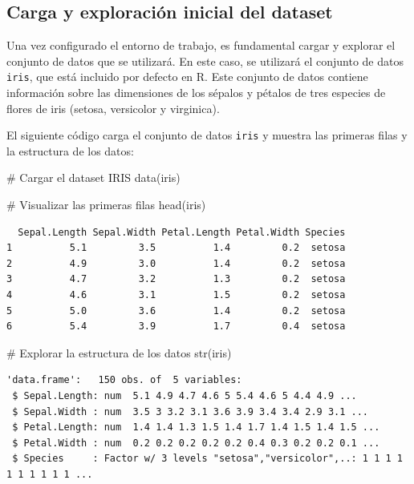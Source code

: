 \documentclass[
  spanish,
  a4paper,
  DIV=11,
  numbers=noendperiod,
  onepage,
  openany]{scrreprt}
\newenvironment{Shaded}{\begin{snugshade}}{\end{snugshade}}
\newcommand{\CommentTok}[1]{\textcolor[rgb]{0.37,0.37,0.37}{#1}}
\newcommand{\FunctionTok}[1]{\textcolor[rgb]{0.28,0.35,0.67}{#1}}
\newcommand{\NormalTok}[1]{\textcolor[rgb]{0.00,0.23,0.31}{#1}}
\begin{document}
\subsection{Carga y exploración inicial del
dataset}\label{carga-y-exploraciuxf3n-inicial-del-dataset}

Una vez configurado el entorno de trabajo, es fundamental cargar y
explorar el conjunto de datos que se utilizará. En este caso, se
utilizará el conjunto de datos \texttt{iris}, que está incluido por
defecto en R. Este conjunto de datos contiene información sobre las
dimensiones de los sépalos y pétalos de tres especies de flores de iris
(setosa, versicolor y virginica).

El siguiente código carga el conjunto de datos \texttt{iris} y muestra
las primeras filas y la estructura de los datos:

\begin{Shaded}
\begin{Highlighting}[]
\CommentTok{\# Cargar el dataset IRIS}
\FunctionTok{data}\NormalTok{(iris)}

\CommentTok{\# Visualizar las primeras filas}
\FunctionTok{head}\NormalTok{(iris)}
\end{Highlighting}
\end{Shaded}

\begin{verbatim}
  Sepal.Length Sepal.Width Petal.Length Petal.Width Species
1          5.1         3.5          1.4         0.2  setosa
2          4.9         3.0          1.4         0.2  setosa
3          4.7         3.2          1.3         0.2  setosa
4          4.6         3.1          1.5         0.2  setosa
5          5.0         3.6          1.4         0.2  setosa
6          5.4         3.9          1.7         0.4  setosa
\end{verbatim}

\begin{Shaded}
\begin{Highlighting}[]
\CommentTok{\# Explorar la estructura de los datos}
\FunctionTok{str}\NormalTok{(iris)}
\end{Highlighting}
\end{Shaded}

\begin{verbatim}
'data.frame':   150 obs. of  5 variables:
 $ Sepal.Length: num  5.1 4.9 4.7 4.6 5 5.4 4.6 5 4.4 4.9 ...
 $ Sepal.Width : num  3.5 3 3.2 3.1 3.6 3.9 3.4 3.4 2.9 3.1 ...
 $ Petal.Length: num  1.4 1.4 1.3 1.5 1.4 1.7 1.4 1.5 1.4 1.5 ...
 $ Petal.Width : num  0.2 0.2 0.2 0.2 0.2 0.4 0.3 0.2 0.2 0.1 ...
 $ Species     : Factor w/ 3 levels "setosa","versicolor",..: 1 1 1 1 1 1 1 1 1 1 ...
\end{verbatim}
\end{document}
